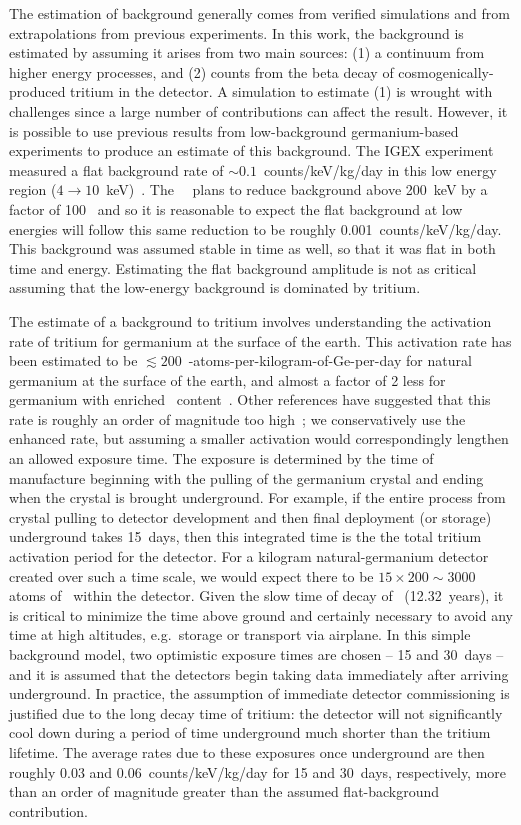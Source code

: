 The estimation of background generally comes from verified simulations and from extrapolations from previous experiments.  In this work, the background is estimated by assuming it arises from two main sources: (1) a continuum from higher energy processes, and (2) counts from the beta decay of cosmogenically-produced tritium in the detector.  A simulation to estimate (1) is wrought with challenges since a large number of contributions can affect the result.  However, it is possible to use previous results from low-background germanium-based experiments to produce an estimate of this background.  The IGEX experiment measured a flat background rate of $\sim0.1$~counts/keV/kg/day in this low energy region ($4\to10$~keV)~\cite{Ira01}.    The \MJ~\minmod~plans to reduce background above 200~keV by a factor of 100~\cite{Gaitskell:2003zr} and so it is reasonable to expect the flat background at low energies will follow this same reduction to be roughly 0.001~counts/keV/kg/day.  This background was assumed stable in time as well, so that it was flat in both time and energy.  Estimating the flat background amplitude is not as critical assuming that the low-energy background is dominated by tritium.  

The estimate of a background to tritium involves understanding the activation rate of tritium for germanium at the surface of the earth.  This activation rate has been estimated to be $\lesssim200$~\hthree-atoms-per-kilogram-of-Ge-per-day for natural germanium at the surface of the earth, and almost a factor of 2 less for germanium with enriched \gersevensix~content~\cite{Avi92}.  Other references have suggested that this rate is roughly an order of magnitude too high~\cite{Col92,Mei:2009vn}; we conservatively use the enhanced rate, but assuming a smaller activation would correspondingly lengthen an allowed exposure time.  The exposure is determined by the time of manufacture beginning with the pulling of the germanium crystal and ending when the crystal is brought underground.  For example, if the entire process from crystal pulling to detector development and then final deployment (or storage) underground takes 15~days, then this integrated time is the the total tritium activation period for the detector.  For a kilogram natural-germanium detector created over such a time scale, we would expect there to be $15\times200\sim3000$ atoms of \hthree~within the detector.  Given the slow time of decay of \hthree~(12.32~years), it is critical to minimize the time above ground and certainly necessary to avoid any time at high altitudes, e.g.~storage or transport via airplane.  In this simple background model, two optimistic exposure times are chosen -- 15 and 30~days -- and it is assumed that the detectors begin taking data immediately after arriving underground.  In practice, the assumption of immediate detector commissioning is justified due to the long decay time of tritium: the detector will not significantly cool down during a period of time underground much shorter than the tritium lifetime.  The average rates due to these exposures once underground are then roughly 0.03 and 0.06~counts/keV/kg/day for 15 and 30~days, respectively, more than an order of magnitude greater than the assumed flat-background contribution.  

